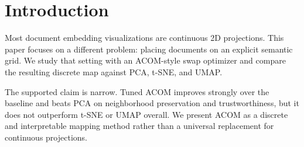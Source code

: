 \section{Introduction}

Most document embedding visualizations are continuous 2D projections. This paper focuses on a different problem: placing documents on an explicit semantic grid. We study that setting with an ACOM-style swap optimizer and compare the resulting discrete map against PCA, t-SNE, and UMAP.

The supported claim is narrow. Tuned ACOM improves strongly over the baseline and beats PCA on neighborhood preservation and trustworthiness, but it does not outperform t-SNE or UMAP overall. We present ACOM as a discrete and interpretable mapping method rather than a universal replacement for continuous projections.

